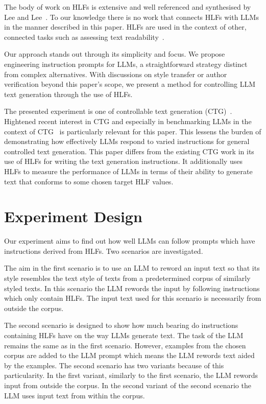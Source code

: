 \documentclass[a4paper,twoside]{article}
\begin{document}
The body of work on HLFs is extensive and well referenced and synthesised by
Lee and Lee~\cite{lftk-2023}.
To our knowledge there is no work that connects HLFs with LLMs in the manner
described in this paper.
HLFs are used in the context of other, connected tasks such as assessing text
readability~\cite{lee-etal-2021-pushing}.

Our approach stands out through its simplicity and focus.
We propose engineering instruction prompts for LLMs, a straightforward strategy
distinct from complex alternatives.
With discussions on style transfer or author verification beyond this paper's
scope, we present a method for controlling LLM text generation through the use
of HLFs.

The presented experiment is one of controllable text
generation (CTG)~\cite{zhang-ctg-2022}.
Hightened recent interest in CTG and especially in benchmarking LLMs in the
context of CTG~\cite{chen2024benchmarking} is particularly relevant for this
paper.
This lessens the burden of demonstrating how effectively LLMs respond to varied
instructions for general controlled text generation.
This paper differs from the existing CTG work in its use of HLFs for writing
the text generation instructions.
It additionally uses HLFs to measure the performance of LLMs in terms of their
ability to generate text that conforms to some chosen target HLF values.

\section{Experiment Design}\label{method}

Our experiment aims to find out how well LLMs can follow prompts which have
instructions derived from HLFs.
Two scenarios are investigated.

The aim in the first scenario is to use an LLM to reword an input text so that
its style resembles the text style of texts from a predetermined corpus of
similarly styled texts.
In this scenario the LLM rewords the input by following instructions which only
contain HLFs.
The input text used for this scenario is necessarily from outside the corpus.

The second scenario is designed to show how much bearing do instructions
containing HLFs have on the way LLMs generate text.
The task of the LLM remains the same as in the first scenario.
However, examples from the chosen corpus are added to the LLM prompt which means
the LLM rewords text aided by the examples.
The second scenario has two variants because of this particularity.
In the first variant, similarly to the first scenario, the LLM rewords input
from outside the corpus.
In the second variant of the second scenario the LLM uses input text from within
the corpus.
\end{document}
